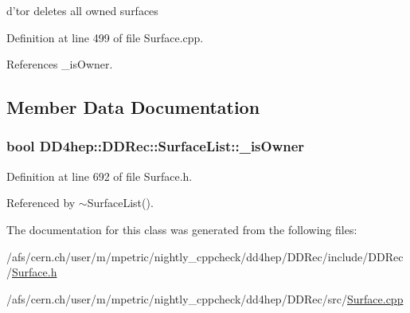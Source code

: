 d'tor deletes all owned surfaces 

Definition at line 499 of file Surface.cpp.

References \_\-isOwner.

\subsection{Member Data Documentation}
\hypertarget{class_d_d4hep_1_1_d_d_rec_1_1_surface_list_a6eb49bbfb8b3b4f548dd9d52f0e0e507}{
\subsubsection[{\_\-isOwner}]{\setlength{\rightskip}{0pt plus 5cm}bool {\bf DD4hep::DDRec::SurfaceList::\_\-isOwner}}}
\label{class_d_d4hep_1_1_d_d_rec_1_1_surface_list_a6eb49bbfb8b3b4f548dd9d52f0e0e507}


Definition at line 692 of file Surface.h.

Referenced by $\sim$SurfaceList().

The documentation for this class was generated from the following files:\begin{DoxyCompactItemize}
\item 
/afs/cern.ch/user/m/mpetric/nightly\_\-cppcheck/dd4hep/DDRec/include/DDRec/\hyperlink{_surface_8h}{Surface.h}\item 
/afs/cern.ch/user/m/mpetric/nightly\_\-cppcheck/dd4hep/DDRec/src/\hyperlink{_surface_8cpp}{Surface.cpp}\end{DoxyCompactItemize}
